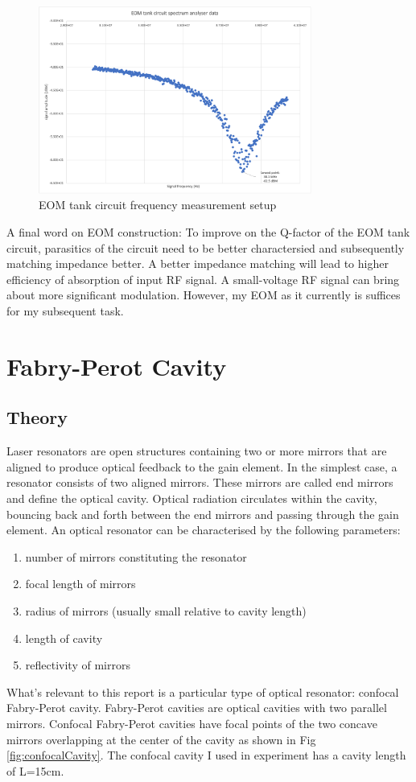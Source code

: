 \documentclass[12pt]{report}
\begin{document}
\begin{figure}[H]
    \centering
    \includegraphics[width=0.8\textwidth]{EOMfrequencyMeasurement.png}
    \caption{EOM tank circuit frequency measurement setup}
    \label{fig:EOMfrequencyMeasurement}
\end{figure}

A final word on EOM construction: To improve on the Q-factor of the EOM tank circuit, parasitics of the circuit need to be better charactersied and subsequently matching impedance better. A better impedance matching will lead to higher efficiency of absorption of input RF signal. A small-voltage RF signal can bring about more significant modulation. However, my EOM as it currently is suffices for my subsequent task. 

\section{Fabry-Perot Cavity}
\subsection{Theory}
Laser resonators are open structures containing two or more mirrors that are aligned to produce optical feedback to the gain element. In the simplest case, a resonator consists of two aligned mirrors. These mirrors are called end mirrors and define the optical cavity. Optical radiation circulates within the cavity, bouncing back and forth between the end mirrors and passing through the gain element. An optical resonator can be characterised by the following parameters: 
\begin{enumerate}
    \item number of mirrors constituting the resonator
    \item focal length of mirrors
    \item radius of mirrors (usually small relative to cavity length)
    \item length of cavity
    \item reflectivity of mirrors
\end{enumerate}
What's relevant to this report is a particular type of optical resonator: confocal Fabry-Perot cavity. Fabry-Perot cavities are optical cavities with two parallel mirrors. Confocal Fabry-Perot cavities have focal points of the two concave mirrors overlapping at the center of the cavity as shown in Fig \ref{fig:confocalCavity}. The confocal cavity I used in experiment has a cavity length of L=15cm. 
\end{document}
